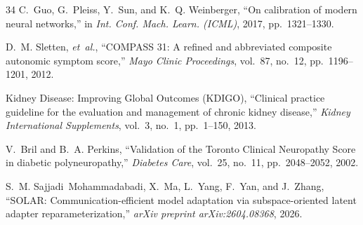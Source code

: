 \documentclass[journal,10pt,twocolumn]{IEEEtran}
\begin{document}
\begin{thebibliography}{34}
C.~Guo, G.~Pleiss, Y.~Sun, and K.~Q. Weinberger, ``On calibration of modern neural networks,'' in \emph{Int. Conf. Mach. Learn. (ICML)}, 2017, pp.~1321--1330.

D.~M. Sletten, \emph{et~al.}, ``COMPASS 31: A refined and abbreviated composite autonomic symptom score,'' \emph{Mayo Clinic Proceedings}, vol.~87, no.~12, pp.~1196--1201, 2012.

Kidney Disease: Improving Global Outcomes (KDIGO), ``Clinical practice guideline for the evaluation and management of chronic kidney disease,'' \emph{Kidney International Supplements}, vol.~3, no.~1, pp.~1--150, 2013.

V.~Bril and B.~A. Perkins, ``Validation of the Toronto Clinical Neuropathy Score in diabetic polyneuropathy,'' \emph{Diabetes Care}, vol.~25, no.~11, pp.~2048--2052, 2002.

S.~M. Sajjadi~Mohammadabadi, X.~Ma, L.~Yang, F.~Yan, and J.~Zhang, ``SOLAR: Communication-efficient model adaptation via subspace-oriented latent adapter reparameterization,'' \emph{arXiv preprint arXiv:2604.08368}, 2026.

\end{thebibliography}
\end{document}
